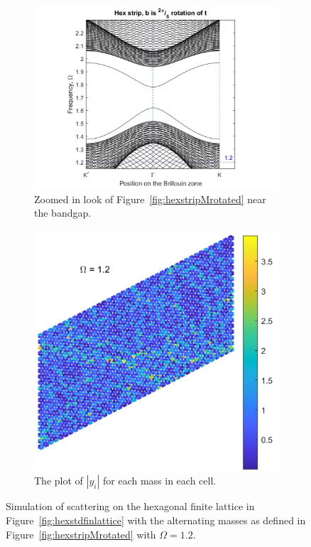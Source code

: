 \begin{figure}
\centering
\begin{subfigure}[b]{.5\textwidth}
  \centering
  \includegraphics[width=1.1\linewidth]{imgs/hexstripperturbMrotatedrand.png}
  \caption{Zoomed in look of Figure~\ref{fig:hexstripMrotated} near the bandgap.}
\label{fig:sub1}
\end{subfigure}%
\begin{subfigure}[b]{.5\textwidth}
  \centering
  \includegraphics[width=1\linewidth]{imgs/hexstdrandscat.png}
  \caption{The plot of $|y_i|$ for each mass in each cell.}
  \label{fig:sub2}
\end{subfigure}
\caption{Simulation of scattering on the hexagonal finite lattice in
  Figure~\ref{fig:hexstdfinlattice} with the alternating masses as defined in
  Figure~\ref{fig:hexstripMrotated} with $\Omega = 1.2$.}
\label{fig:randscat}
\end{figure}

